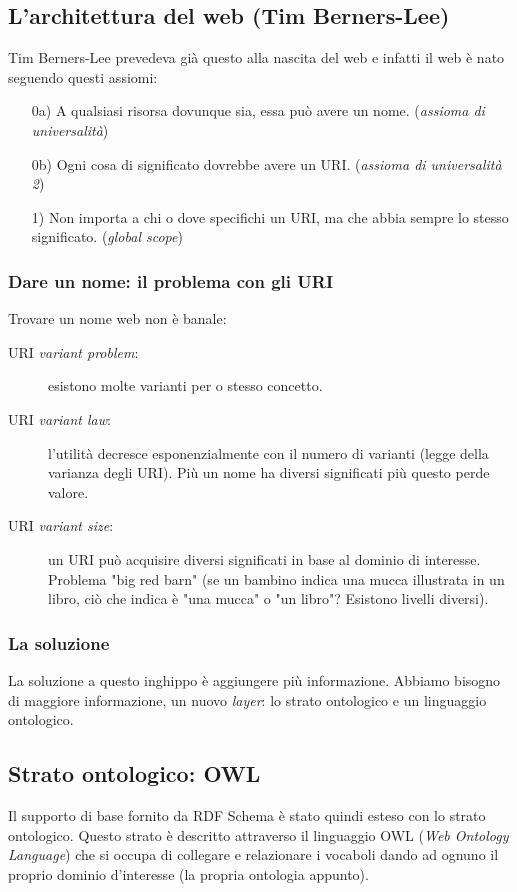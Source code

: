 		\subsection{L'architettura del web (Tim Berners-Lee)}
			Tim Berners-Lee prevedeva già questo alla nascita del web e infatti il web è nato seguendo questi assiomi:
			\begin{itemize}
				\item [0a)] A qualsiasi risorsa dovunque sia, essa può avere un nome. (\emph{assioma di universalità})
				\item [0b)] Ogni cosa di significato dovrebbe avere un URI. (\emph{assioma di universalità 2})
				\item [1)] Non importa a chi o dove specifichi un URI, ma che abbia sempre lo stesso significato. (\emph{global scope})
			\end{itemize}
			
			\subsubsection{Dare un nome: il problema con gli URI}
				Trovare un nome web non è banale:
				\begin{description}
					\item[URI \emph{variant problem}:] esistono molte varianti per o stesso concetto.
					\item[URI \emph{variant law}:] l'utilità decresce esponenzialmente con il numero di varianti (legge della varianza degli URI). Più un nome ha diversi significati più questo perde valore.
					\item[URI \emph{variant size}:] un URI può acquisire diversi significati in base al dominio di interesse. Problema "big red barn" (se un bambino indica una mucca illustrata in un libro, ciò che indica è "una mucca" o "un libro"? Esistono livelli diversi).
				\end{description}
				
			
			\subsubsection{La soluzione}
				La soluzione a questo inghippo è aggiungere più informazione. Abbiamo bisogno di maggiore informazione, un nuovo \emph{layer}: lo strato ontologico e un linguaggio ontologico.
		
		\subsection{Strato ontologico: OWL}
			Il supporto di base fornito da RDF Schema è stato quindi esteso con lo strato ontologico. Questo strato è descritto attraverso il linguaggio OWL (\emph{Web Ontology Language}) che si occupa di collegare e relazionare i vocaboli dando ad ognuno il proprio dominio d'interesse (la propria ontologia appunto).
		
